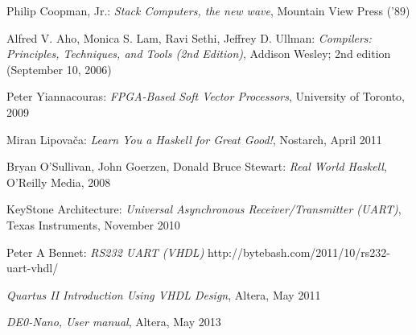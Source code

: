 \begin{thebibliography}{99}
 Philip Coopman, Jr.:
\emph{Stack Computers, the new wave},
Mountain View Press ('89)

 Alfred V. Aho, Monica S. Lam, Ravi Sethi, Jeffrey D. Ullman:
\emph{Compilers: Principles, Techniques, and Tools (2nd Edition)},
Addison Wesley; 2nd edition (September 10, 2006)

 Peter Yiannacouras:
\emph{FPGA-Based Soft Vector Processors},
University of Toronto, 2009

 Miran Lipovača:
\emph{Learn You a Haskell for Great Good!},
Nostarch, April 2011

 Bryan O'Sullivan, John Goerzen, Donald Bruce Stewart:
\emph{Real World Haskell},
O'Reilly Media, 2008

 KeyStone Architecture:
\emph{Universal Asynchronous Receiver/Transmitter (UART)},
Texas Instruments, November 2010

Peter A Bennet:
\emph{RS232 UART (VHDL)}
http://bytebash.com/2011/10/rs232-uart-vhdl/

\emph{Quartus II Introduction Using VHDL Design},
Altera, May 2011

\emph{DE0-Nano, User manual},
Altera, May 2013
\end{thebibliography}

